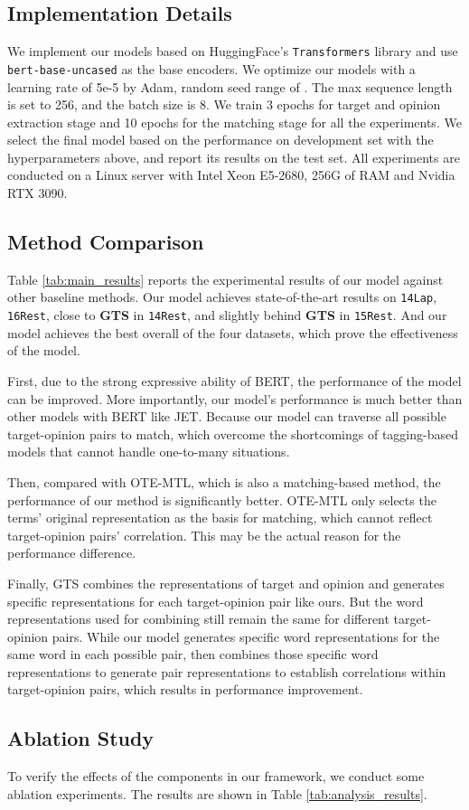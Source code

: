 \documentclass[11pt]{article}
\begin{document}
\subsection{Implementation Details}
We implement our models based on HuggingFace’s \texttt{Transformers} library \cite{wolf-etal-2020-transformers} and use \texttt{bert-base-uncased} \cite{devlin2018bert} as the base encoders. We optimize our models with a learning rate of 5e-5 by Adam, random seed range of . The max sequence length is set to 256, and the batch size is 8. We train 3 epochs for target and opinion extraction stage and 10 epochs for the matching stage for all the experiments.
We select the final model based on the performance on development set with the hyperparameters above, and report its results on the test set.
All experiments are conducted on a Linux server with Intel Xeon E5-2680, 256G of RAM and Nvidia RTX 3090. 



\subsection{Method Comparison}
Table \ref{tab:main_results} reports the experimental results of our model against other baseline methods. Our model achieves state-of-the-art results on \texttt{14Lap}, \texttt{16Rest}, close to \textbf{GTS} in \texttt{14Rest}, and slightly behind \textbf{GTS} in \texttt{15Rest}. And our model achieves the best overall  of the four datasets, which prove the effectiveness of the model.

First, due to the strong expressive ability of BERT,
the performance of the model can be improved. 
More importantly, our model's performance is much better than other models with BERT like  {JET}. 
Because our model can traverse all possible target-opinion pairs to match, which overcome the shortcomings of tagging-based models that cannot handle one-to-many situations.

Then, compared with OTE-MTL, which is also a matching-based method, the performance of our method is significantly better. OTE-MTL only selects the terms' original representation as the basis for matching, which cannot reflect target-opinion pairs' correlation. This may be the actual reason for the performance difference. 

Finally, GTS combines the representations of target and opinion and generates specific representations for each target-opinion pair like ours. But the word representations used for combining still remain the same for different target-opinion pairs. While our model generates specific word representations for the same word in each possible pair, then combines those specific word representations to generate pair representations to establish correlations within target-opinion pairs, which results in performance improvement. \subsection{Ablation Study}
To verify the effects of the components in our framework, we conduct some ablation experiments. The results are shown in Table \ref{tab:analysis_results}. 
\end{document}
